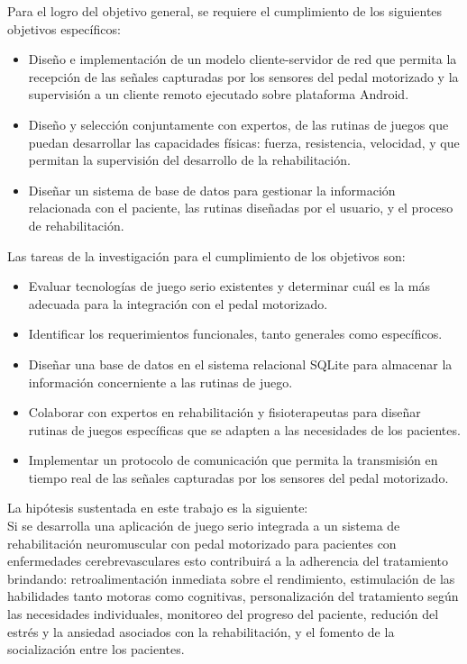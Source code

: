 \begin{introduction}
    \vspace{5pt}
    Para el logro del objetivo general, se requiere el cumplimiento de los siguientes objetivos específicos:
    \begin{itemize}
        \item Diseño e implementación de un modelo cliente-servidor de red que permita la
        recepción de las señales capturadas por los sensores del pedal motorizado
        y la supervisión a un cliente remoto ejecutado sobre plataforma Android.
        \item  Diseño y selección conjuntamente con expertos, de las rutinas de juegos que
        puedan desarrollar las capacidades físicas: fuerza, resistencia, velocidad, y que
        permitan la supervisión del desarrollo de la rehabilitación.
        \item Diseñar un sistema de base de datos para gestionar la información relacionada con
        el paciente, las rutinas diseñadas por el usuario, y el proceso de
        rehabilitación.
    \end{itemize}
    Las tareas de la investigación para el cumplimiento de los objetivos son:
    \begin{itemize}
        \item Evaluar tecnologías de juego serio existentes y determinar cuál es la más adecuada para la integración con el pedal motorizado.
        \item Identificar los requerimientos funcionales, tanto generales como específicos.
        \item Diseñar una base de datos en el sistema relacional SQLite para almacenar la información concerniente a las rutinas de juego. 
        \item Colaborar con expertos en rehabilitación y fisioterapeutas para diseñar rutinas de juegos específicas que se adapten a las necesidades de los pacientes.
        \item Implementar un protocolo de comunicación que permita la transmisión en tiempo real de las señales capturadas por los sensores del pedal motorizado. 
    \end{itemize}

    La hipótesis sustentada en este trabajo es la siguiente:\\
    Si se desarrolla una aplicación de juego serio integrada a un sistema de rehabilitación neuromuscular con pedal motorizado para pacientes con
    enfermedades cerebrevasculares esto contribuirá a la adherencia del tratamiento brindando: retroalimentación inmediata sobre el rendimiento, estimulación de las 
    habilidades tanto motoras como cognitivas, personalización del tratamiento según las necesidades individuales, monitoreo del progreso del paciente, redución 
    del estrés y la ansiedad asociados con la rehabilitación, y el fomento de la socialización entre los pacientes.


\end{introduction}
